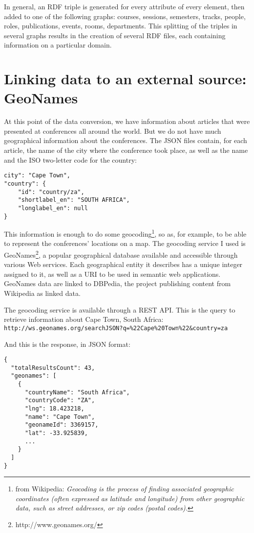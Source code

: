 \documentclass[a4paper,11pt]{report}
\begin{document}
In general, an RDF triple is generated for every attribute of every element, then added to one of the following graphs: courses, sessions, semesters, tracks, people, roles, publications, events, rooms, departments. This splitting of the triples in several graphs results in the creation of several RDF files, each containing information on a particular domain. 

\section{Linking data to an external source: GeoNames}
At this point of the data conversion, we have information about articles that were presented at conferences all around the world. But we do not have much geographical information about the conferences. The JSON files contain, for each article, the name of the city where the conference took place, as well as the name and the ISO two-letter code for the country:
\begin{verbatim}
city": "Cape Town",
"country": {
    "id": "country/za",
    "shortlabel_en": "SOUTH AFRICA",
    "longlabel_en": null
}
\end{verbatim}

This information is enough to do some geocoding\footnote{from Wikipedia: \emph{Geocoding is the process of finding associated geographic coordinates (often expressed as latitude and longitude) from other geographic data, such as street addresses, or zip codes (postal codes). }}, so as, for example, to be able to represent the conferences' locations on a map. The geocoding service I used is GeoNames\footnote{http://www.geonames.org/}, a popular geographical database available and accessible through various Web services. Each geographical entity it describes has a unique integer assigned to it, as well as a URI to be used in semantic web applications. GeoNames data are linked to DBPedia, the project publishing content from Wikipedia as linked data. 

The geocoding service is available through a REST API. This is the query to retrieve information about Cape Town, South Africa:\\
\texttt{http://ws.geonames.org/searchJSON?q=\%22Cape\%20Town\%22\&country=za}

And this is the response, in JSON format:
\begin{verbatim}
{
  "totalResultsCount": 43,
  "geonames": [
    {
      "countryName": "South Africa",
      "countryCode": "ZA",
      "lng": 18.423218,
      "name": "Cape Town",
      "geonameId": 3369157,
      "lat": -33.925839,
      ...
    }
  ]
}
\end{verbatim}
\end{document}
